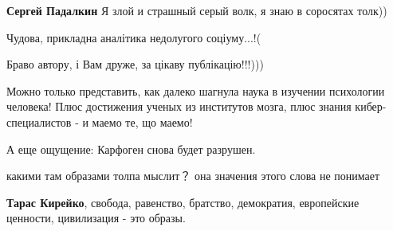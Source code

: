 \begin{itemize}
\begin{itemize}
 
\textbf{Сергей Падалкин}
Я злой и страшный серый волк, я знаю в соросятах толк))
\end{itemize}

 
Чудова, прикладна аналітика недолугого соціуму...!(

Браво автору, і Вам друже, за цікаву публікацію!!!)))

 

Можно только представить, как далеко шагнула наука в изучении психологии
человека! Плюс достижения ученых из институтов мозга, плюс знания
кибер-специалистов - и маемо те, що маемо!

А еще ощущение: Карфоген снова будет разрушен.


 

какими там образами толпа мыслит？ она значения этого слова не понимает

\begin{itemize}
 
\textbf{Тарас Кирейко}, свобода, равенство, братство, демократия, европейские ценности, цивилизация - это образы.

 

\end{itemize}
\end{itemize}
